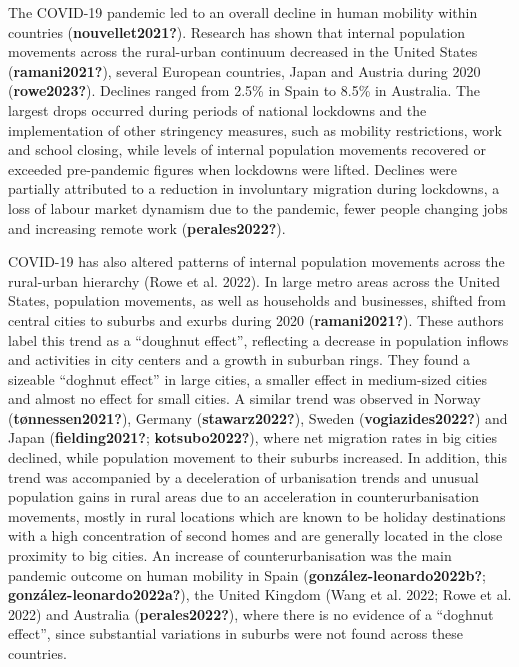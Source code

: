 \documentclass[11pt,letterpaper]{article}
\begin{document}
The COVID-19 pandemic led to an overall decline in human mobility within
countries (\textbf{nouvellet2021?}). Research has shown that internal
population movements across the rural-urban continuum decreased in the
United States (\textbf{ramani2021?}), several European countries, Japan
and Austria during 2020 (\textbf{rowe2023?}). Declines ranged from 2.5\%
in Spain to 8.5\% in Australia. The largest drops occurred during
periods of national lockdowns and the implementation of other stringency
measures, such as mobility restrictions, work and school closing, while
levels of internal population movements recovered or exceeded
pre-pandemic figures when lockdowns were lifted. Declines were partially
attributed to a reduction in involuntary migration during lockdowns, a
loss of labour market dynamism due to the pandemic, fewer people
changing jobs and increasing remote work (\textbf{perales2022?}).

COVID-19 has also altered patterns of internal population movements
across the rural-urban hierarchy (Rowe et al. 2022). In large metro
areas across the United States, population movements, as well as
households and businesses, shifted from central cities to suburbs and
exurbs during 2020 (\textbf{ramani2021?}). These authors label this
trend as a ``doughnut effect'', reflecting a decrease in population
inflows and activities in city centers and a growth in suburban rings.
They found a sizeable ``doghnut effect'' in large cities, a smaller
effect in medium-sized cities and almost no effect for small cities. A
similar trend was observed in Norway (\textbf{tønnessen2021?}), Germany
(\textbf{stawarz2022?}), Sweden (\textbf{vogiazides2022?}) and Japan
(\textbf{fielding2021?}; \textbf{kotsubo2022?}), where net migration
rates in big cities declined, while population movement to their suburbs
increased. In addition, this trend was accompanied by a deceleration of
urbanisation trends and unusual population gains in rural areas due to
an acceleration in counterurbanisation movements, mostly in rural
locations which are known to be holiday destinations with a high
concentration of second homes and are generally located in the close
proximity to big cities. An increase of counterurbanisation was the main
pandemic outcome on human mobility in Spain
(\textbf{gonzález-leonardo2022b?}; \textbf{gonzález-leonardo2022a?}),
the United Kingdom (Wang et al. 2022; Rowe et al. 2022) and Australia
(\textbf{perales2022?}), where there is no evidence of a ``doghnut
effect'', since substantial variations in suburbs were not found across
these countries.
\end{document}
